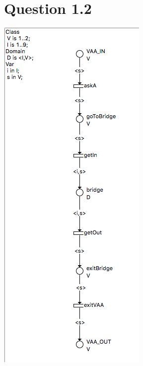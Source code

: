 \documentclass[a4paper, 11pt]{article}
\begin{document}
\section{Question 1.2}
\includegraphics[scale=0.35]{VAA.png}
\end{document}
